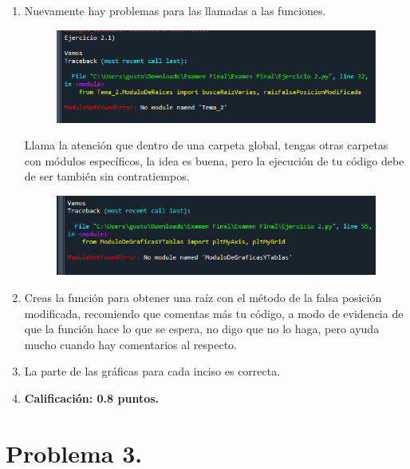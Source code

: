 \begin{enumerate}
\item Nuevamente hay problemas para las llamadas a las funciones.
\begin{figure}[H]
    \centering
    \includegraphics[scale=0.8]{Evidencia_Antonio_05.png}
\end{figure}
Llama la atención que dentro de una carpeta global, tengas otras carpetas con módulos específicos, la idea es buena, pero la ejecución de tu código debe de ser también sin contratiempos.
\begin{figure}[H]
    \centering
    \includegraphics[scale=0.8]{Evidencia_Antonio_06.png}
\end{figure}
\item Creas la función para obtener una raíz con el método de la falsa posición modificada, recomiendo que comentas más tu código, a modo de evidencia de que la función hace lo que se espera, no digo que no lo haga, pero ayuda mucho cuando hay comentarios al respecto.
\item La parte de las gráficas para cada inciso es correcta.
\item \textbf{Calificación: 0.8 puntos.}
\end{enumerate}

\section{Problema 3.}

